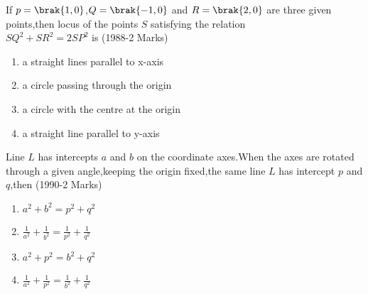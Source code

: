     \item If $p=\brak{1,0}$,$Q=\brak{-1,0}$ and $R=\brak{2,0}$ are three given points,then locus of the points $S$ satisfying the relation\\
    $SQ^2+SR^2=2SP^2$ is 
    \hfill(1988-2 Marks)
    \begin{enumerate}		    
        \item a straight lines parallel to x-axis
        \item a circle passing through the origin
        \item a circle with the centre at the origin 
        \item a straight line parallel to y-axis
    \end{enumerate}	
    \item Line $L$ has intercepts $a$ and $b$ on the coordinate axes.When the axes are rotated through a given angle,keeping the origin fixed,the same line $L$ has intercept $p$ and $q$,then 
    \hfill(1990-2 Marks)
    \begin{multicols}{2}
    \begin{enumerate}
        \item $a^2+b^2=p^2+q^2$
        \item $\frac{1}{a^2}+\frac{1}{b^2}=\frac{1}{p^2}+\frac{1}{q^2}$
        \item $a^2+p^2=b^2+q^2$
        \item $\frac{1}{a^2}+\frac{1}{p^2}=\frac{1}{b^2}+\frac{1}{q^2}$
    \end{enumerate}
    \end{multicols}    

